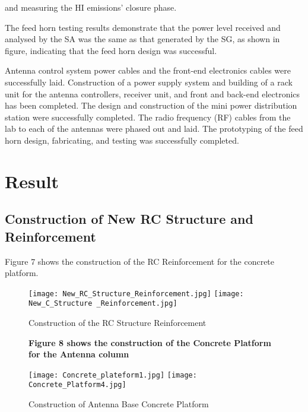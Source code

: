 { and measuring the HI emissions' closure phase.


The feed horn testing results demonstrate that the power level received and analysed by the SA was the same as that generated by the SG, as shown in figure, indicating that the feed horn design was successful.

Antenna control system power cables and the front-end electronics cables were successfully laid.
Construction of a power supply system and building of a rack unit for the antenna controllers, receiver unit, and front and back-end electronics has been completed.
The design and construction of the mini power distribution station were successfully completed.
The radio frequency (RF) cables from the lab to each of the antennas were phased out and laid.
The prototyping of the feed horn design, fabricating, and testing was successfully completed.
 
 







\section{Result}

\subsection{Construction of New RC Structure and Reinforcement}
Figure 7  shows the construction of the RC Reinforcement for the concrete platform.

\begin{figure}[htp]
\texttt{[image: New\_RC\_Structure\_Reinforcement.jpg]}
\texttt{[image: New\_C\_Structure \_Reinforcement.jpg]}
\caption{Construction of the RC Structure Reinforcement}
\label{fig:galaxy}

 \vspace{0.5cm}
 
    \textbf{Figure 8 shows the construction of the Concrete Platform for the Antenna column}
    
 \texttt{[image: Concrete\_plateform1.jpg]}  
\texttt{[image: Concrete\_Platform4.jpg]}
\caption{Construction of Antenna Base Concrete
Platform}
\label{fig:galaxy}
\end{figure}

}
